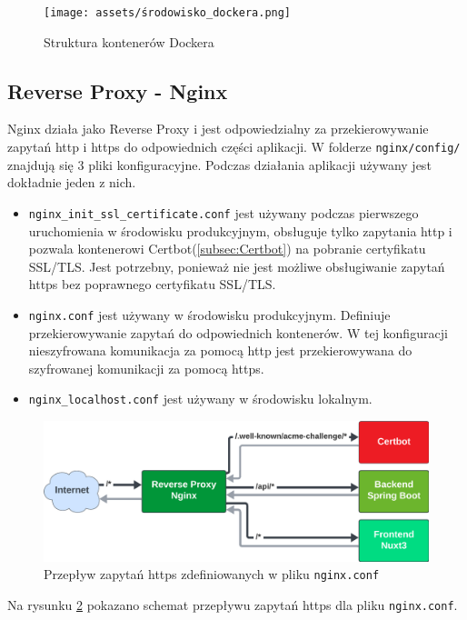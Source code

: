 \documentclass[shortabstract]{iithesis}
\begin{document}
\begin{figure}[H]
    \centering
    \texttt{[image: assets/środowisko\_dockera.png]}
    \caption{Struktura kontenerów Dockera}
    \label{fig:docker_containers_environment}
\end{figure}

\subsection{Reverse Proxy - Nginx}
Nginx\cite{Nginx} działa jako Reverse Proxy i jest odpowiedzialny za przekierowywanie zapytań http i https do odpowiednich części aplikacji.
W folderze \texttt{nginx/config/} znajdują się 3 pliki konfiguracyjne. Podczas działania aplikacji używany jest dokładnie jeden z nich.

\begin{itemize}
    \item \texttt{nginx\_init\_ssl\_certificate.conf} jest używany podczas pierwszego uruchomienia w środowisku produkcyjnym, obsługuje tylko zapytania http i pozwala kontenerowi Certbot(\ref{subsec:Certbot}) na pobranie certyfikatu SSL/TLS. Jest potrzebny, ponieważ nie jest możliwe obsługiwanie zapytań https bez poprawnego certyfikatu SSL/TLS.
    \item \texttt{nginx.conf} jest używany w środowisku produkcyjnym. Definiuje przekierowywanie zapytań do odpowiednich kontenerów. W tej konfiguracji nieszyfrowana komunikacja za pomocą http jest przekierowywana do szyfrowanej komunikacji za pomocą https.
    \item \texttt{nginx\_localhost.conf} jest używany w środowisku lokalnym.
\end{itemize}
\begin{figure}[H]
    \centering
    \includegraphics[width=\textwidth]{assets/przepływ_zapytań_http.png}
    \caption{Przepływ zapytań https zdefiniowanych w pliku \texttt{nginx.conf}}
    \label{fig:https_requests_flow}
\end{figure}
Na rysunku \ref{fig:https_requests_flow} pokazano schemat przepływu zapytań https dla pliku \texttt{nginx.conf}.
\end{document}
